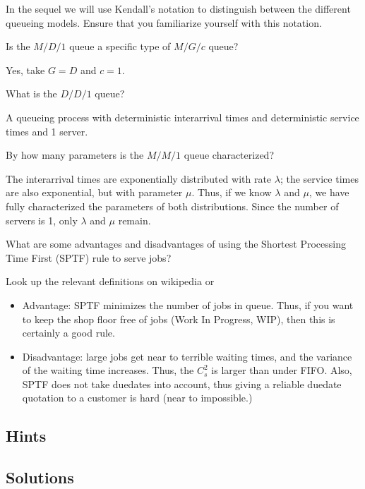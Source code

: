In the sequel we will use Kendall's notation to distinguish between the different queueing models. Ensure that you familiarize yourself with this notation.


\begin{question}
  Is the $M/D/1$ queue a specific type of  $M/G/c$ queue? 
  \begin{solution}
    Yes, take $G=D$ and $c=1$. 
  \end{solution}
\end{question}

\begin{question}
What is the $D/D/1$ queue?  
\begin{solution}
  A queueing process with deterministic interarrival times and deterministic service times and 1 server.
\end{solution}
\end{question}

\begin{question}
  By how many parameters is the $M/M/1$ queue characterized?
  \begin{solution}
    The interarrival times are exponentially distributed with rate $\lambda$; the service times are also exponential, but with parameter $\mu$. Thus, if we know $\lambda$ and $\mu$, we have fully characterized the parameters of both distributions. Since the number of servers is 1, only $\lambda$ and $\mu$ remain.
  \end{solution}
\end{question}


\begin{question}
  What are some advantages and disadvantages of using the Shortest
  Processing Time First (SPTF) rule to serve jobs? 
  \begin{hint}
Look up the relevant
  definitions on wikipedia or
  \citet{hall91:_queuein_method_servic_manuf}
  \end{hint}

  \begin{solution}
  \begin{itemize}
  \item Advantage: SPTF minimizes the number of jobs in queue. Thus,
    if you want to keep the shop floor free of jobs (Work In Progress,
    WIP), then this is certainly a good rule. 
  \item Disadvantage: large jobs get near to terrible waiting times,
    and the variance of the waiting time increases. Thus, the $C_s^2$
    is larger than under FIFO. Also, SPTF does not take duedates into
    account, thus giving a reliable duedate quotation to a customer is
    hard (near to impossible.)
  \end{itemize}
  \end{solution}
\end{question}


\subsection*{Hints}

\subsection*{Solutions}

\clearpage

